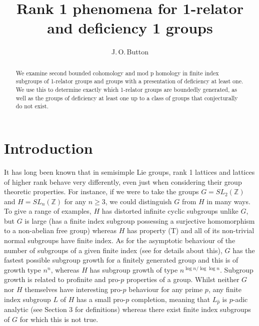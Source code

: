 \documentclass[11pt,reqno]{amsart}
\title{Rank 1 phenomena for 1-relator and deficiency 1 groups}
\author[Button]{J.\,O.\,Button
}
\numberwithin{equation}{section}
\newcommand{\Z}{\mathbb{Z}}
\newcommand{\geqs}{\geqslant}
\theoremstyle{definition}
\theoremstyle{remark}
\begin{document}
\vspace*{-1cm}

\begin{abstract}
  We examine second bounded cohomology and mod p homology in finite index
  subgroups of 1-relator groups and groups with a presentation of
  deficiency at least one. We use this to
  determine exactly which 1-relator groups are boundedly generated, as well
  as the groups of deficiency at least one
  up to a class of groups that conjecturally
  do not exist.
\end{abstract}


        \maketitle

    \setcounter{tocdepth}{1}
\tableofcontents


\section{Introduction}

It has long been known that in semisimple Lie groups, rank 1 lattices and
lattices of higher rank behave very differently, even just when considering
their group theoretic properties. For instance, if we were to take the
groups $G=SL_2(\Z)$ and $H=SL_n(\Z)$ for any $n\geqs 3$, we could
distinguish $G$ from $H$ in many ways. To give a range of examples, $H$ has
distorted infinite cyclic subgroups unlike $G$, but $G$ is large (has a
finite index subgroup possessing a surjective homomorphism to a  non-abelian
free group) whereas $H$ has property (T) and all of its non-trivial
normal subgroups have finite index. As for the asymptotic behaviour of
the number of subgroups of a given finite index (see \cite{lssg} for
details about this), $G$ has the fastest possible subgroup growth for
a finitely generated group and this is of growth type $n^n$, whereas
$H$ has subgroup growth of type $n^{\log{n}/\log{\log{n}}}$. Subgroup growth
is related to profinite and pro-$p$ properties of a group. Whilst neither
$G$ nor $H$ themselves have interesting pro-$p$ behaviour for any prime $p$,
any finite index subgroup $L$ of $H$ has a small pro-$p$ completion,
meaning that $L_{\hat{p}}$ is $p$-adic analytic (see Section
3 for definitions) whereas there exist finite index subgroups
of $G$ for which this is not true.
\end{document}

